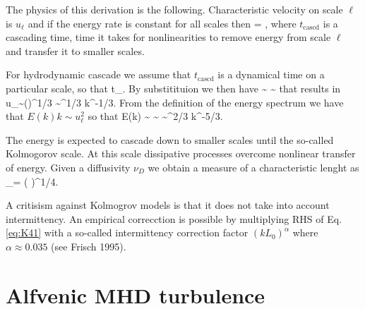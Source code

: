 \documentclass[usenatbib,twocolumn]{aastex63}
\newcommand{\tcascd}{t_\mathrm{cascd}} %
\begin{document}
The physics of this derivation is the following.
Characteristic velocity on scale $\ell$ is $u_\ell$ and if the energy rate is constant for all scales then
\be
\frac{u_\ell^2}{\tcascd} = \varepsilon,
\ee
where $\tcascd$ is a cascading time, time it takes for nonlinearities to remove energy from scale $\ell$ and transfer it to smaller scales.

For hydrodynamic cascade we assume that $\tcascd$ is a dynamical time on a particular scale, so that 
\be
\tcascd \approx {}.
\ee
By substitituion we then have
\be
\varepsilon \sim \frac{u_\ell^2}{\tcascd} \sim {}
\ee
that results in
\be
u_\ell \sim (\varepsilon \ell)^{1/3} \sim \varepsilon^{1/3} k^{-1/3}.
\ee
From the definition of the energy spectrum we have that $E(k) k \sim u_\ell^2$ so that
\be\label{eq:K41}
E(k) \sim {} \sim {} \sim \varepsilon^{2/3} k^{-5/3}.
\ee

The energy is expected to cascade down to smaller scales until the so-called Kolmogorov scale.
At this scale dissipative processes overcome nonlinear transfer of energy.
Given a diffusivity $\nu_D$ we obtain a measure of a characteristic lenght as
\be
\ell_\nu = \left(  \right)^{1/4}.
\ee

A critisism against Kolmogrov models is that it does not take into account intermittency.
An empirical correcction is possible by multiplying RHS of Eq. \eqref{eq:K41} with a so-called intermittency correction factor $(k L_0)^\alpha$ where $\alpha \approx 0.035$ (see Frisch 1995).


\section{Alfvenic MHD turbulence}\label{sect:mhd_theory}
\end{document}
